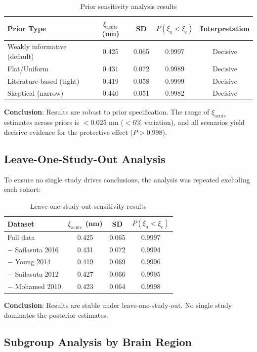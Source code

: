 \documentclass[11pt]{article}
\begin{document}
\begin{table}[h]
\centering
\caption{Prior sensitivity analysis results}
\begin{tabular}{lcccc}
\toprule
\textbf{Prior Type} & $\xi_\text{acute}$ (nm) & SD & $P(\xi_a < \xi_c)$ & Interpretation \\
\midrule
Weakly informative (default) & 0.425 & 0.065 & 0.9997 & Decisive \\
Flat/Uniform & 0.431 & 0.072 & 0.9989 & Decisive \\
Literature-based (tight) & 0.419 & 0.058 & 0.9999 & Decisive \\
Skeptical (narrow) & 0.440 & 0.051 & 0.9982 & Decisive \\
\bottomrule
\end{tabular}
\end{table}

\textbf{Conclusion}: Results are robust to prior specification. The range of $\xi_\text{acute}$ estimates across priors is $<0.025$ nm ($<6\%$ variation), and all scenarios yield decisive evidence for the protective effect ($P > 0.998$).

\subsection{Leave-One-Study-Out Analysis}

To ensure no single study drives conclusions, the analysis was repeated excluding each cohort:

\begin{table}[h]
\centering
\caption{Leave-one-study-out sensitivity results}
\begin{tabular}{lccc}
\toprule
\textbf{Dataset} & $\xi_\text{acute}$ (nm) & SD & $P(\xi_a < \xi_c)$ \\
\midrule
Full data & 0.425 & 0.065 & 0.9997 \\
$-$ Sailasuta 2016 & 0.431 & 0.072 & 0.9994 \\
$-$ Young 2014 & 0.419 & 0.069 & 0.9996 \\
$-$ Sailasuta 2012 & 0.427 & 0.066 & 0.9995 \\
$-$ Mohamed 2010 & 0.423 & 0.064 & 0.9998 \\
\bottomrule
\end{tabular}
\end{table}

\textbf{Conclusion}: Results are stable under leave-one-study-out. No single study dominates the posterior estimates.

\subsection{Subgroup Analysis by Brain Region}
\end{document}
